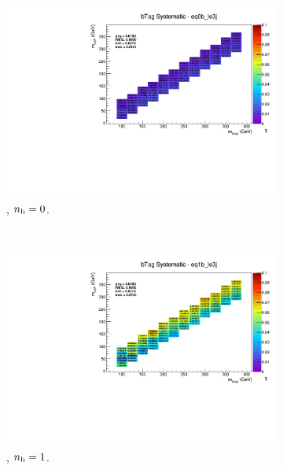 \begin{figure}[ht!]
\begin{subfigure}[b]{0.32\textwidth}
    \includegraphics[width=\textwidth, page=1]{Figs/sms/t2degen/v19_3/systs/T2_4body_bTag_eq0b_le3j.pdf}
    \caption{\njlow, $n_{\text{b}} = 0$.}
  \end{subfigure}\\
  \begin{subfigure}[b]{0.32\textwidth}
    \includegraphics[width=\textwidth, page=14]{Figs/sms/t2degen/v19_3/systs/T2_4body_bTag_eq1b_le3j.pdf}
    \caption{\njlow, $n_{\text{b}} = 1$.}
  \end{subfigure}
  \begin{subfigure}[b]{0.32\textwidth}

\end{subfigure}
\end{figure}
